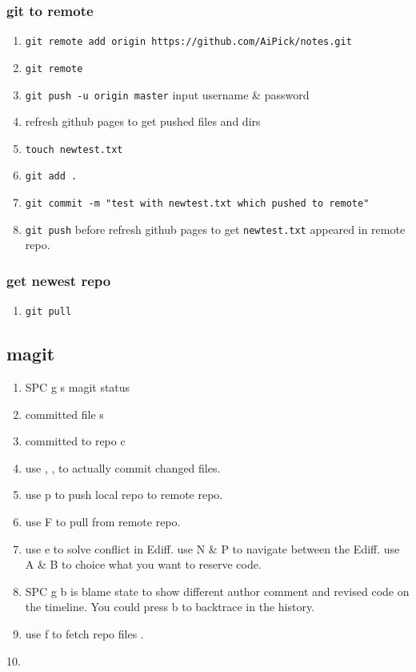 \documentclass[11pt]{article}
\begin{document}
\subsubsection{git to remote}
\label{sec:orgaa2855f}
\begin{enumerate}
\item \texttt{git remote add origin https://github.com/AiPick/notes.git}
\item \texttt{git remote}
\item \texttt{git push -u origin master}
input username \& password
\item refresh github pages to get pushed files and dirs
\item \texttt{touch newtest.txt}
\item \texttt{git add .}
\item \texttt{git commit -m "test with newtest.txt which pushed to remote"}
\item \texttt{git push} before refresh github pages to get \texttt{newtest.txt} appeared in remote repo.
\end{enumerate}
\subsubsection{get newest repo}
\label{sec:orgb5789c6}
\begin{enumerate}
\item \texttt{git pull}
\end{enumerate}

\subsection{magit}
\label{sec:org1bed6b9}
\begin{enumerate}
\item SPC g s  magit status
\item committed file  s
\item committed to repo  c
\item use  , ,   to actually commit changed files.
\item use  p  to push local repo to remote repo.
\item use  F  to pull from remote repo.
\item use  e  to solve conflict in Ediff. 
use  N \& P  to navigate between the Ediff.
use  A \& B  to choice what you want to reserve code.
\item SPC g b  is blame state to show different
author comment and revised code on the timeline. You could press
 b  to backtrace in the history.
\item use  f  to fetch repo files \cite{remy2000using} .
\end{enumerate}
10.\cite{kosba2016hawk} 


\printbibliography[title=参考文献]
\end{document}
